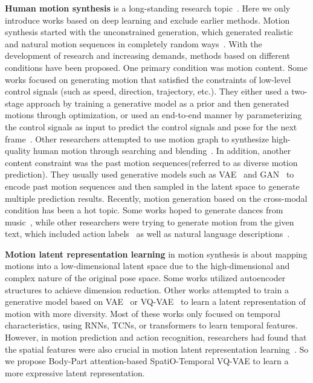 \documentclass[10pt,twocolumn,letterpaper]{article}
\begin{document}
\textbf{Human motion synthesis}
is a long-standing research topic~\cite{xia2017survey}. Here we only introduce works based on deep learning and exclude earlier methods. Motion synthesis started with the unconstrained generation, which generated realistic and natural motion sequences in completely random ways~\cite{fragkiadaki2015recurrent,li2017auto,zhang2020perpetual}. With the development of research and increasing demands, methods based on different conditions have been proposed. One primary condition was motion content. Some works focused on generating motion that satisfied the constraints of low-level control signals (such as speed, direction, trajectory, etc.). They either used a two-stage approach\cite{holden2016deep,wang2019combining,ling2020character} by training a generative model as a prior and then generated motions through optimization, or used an end-to-end manner by parameterizing the control signals as input to predict the control signals and pose for the next frame~\cite{lee2018interactive,holden2017phase,zhang2018mode,starke2019neural,starke2020local,starke2021neural}. Other researchers attempted to use motion graph to synthesize high-quality human motion through searching and blending~\cite{clavet2016motion,
holden2020learned}. In addition, another content constraint was the past motion sequences(referred to as diverse motion prediction). They usually used generative models such as VAE~\cite{walker2017pose,aliakbarian2020stochastic} and GAN~\cite{barsoum2018hp,kundu2019bihmp} to encode past motion sequences and then sampled in the latent space to generate multiple prediction results. Recently, motion generation based on the cross-modal condition has been a hot topic. Some works hoped to generate dances from music~\cite{lee2019dancing,li2020learning,valle2021transflower}, while other researchers were trying to generate motion from the given text, which included action labels~\cite{petrovich2021action,guo2020action2motion,zhong2022learning} as well as natural language descriptions~\cite{ghosh2021synthesis,ahuja2019language2pose,bhattacharya2021text2gestures,ahn2018text2action,Lin2018GeneratingAV,petrovich2022temos,athanasiou2022teach,guo2022generating,zhang2023t2m,chen2023mld,zhang2022motiondiffuse,tevet2023human,guo2022tm2t,tevet2022motionclip,hong2022avatarclip}.

\textbf{Motion latent representation learning}
in motion synthesis is about mapping motions into a low-dimensional latent space due to the high-dimensional and complex nature of the original pose space. Some works utilized autoencoder~\cite{guo2022generating} structures to achieve dimension reduction. Other works attempted to train a generative model based on VAE~\cite{chen2023mld} or VQ-VAE~\cite{zhang2023t2m} to learn a latent representation of motion with more diversity. Most of these works only focused on temporal characteristics, using RNNs, TCNs, or transformers to learn temporal features. However, in motion prediction and action recognition, researchers had found that the spatial features were also crucial in motion latent representation learning~\cite{zhong2022spatio,yan2018spatial}. So we propose Body-Part attention-based SpatiO-Temporal VQ-VAE to learn a more expressive latent representation.
\end{document}
